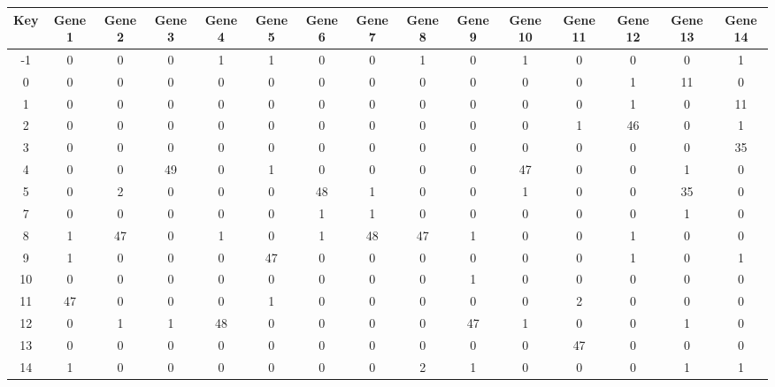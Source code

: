 \begin{tabular}{|c|c|c|c|c|c|c|c|c|c|c|c|c|c|c|}
\hline
Key & Gene 1 & Gene 2 & Gene 3 & Gene 4 & Gene 5 & Gene 6 & Gene 7 & Gene 8 & Gene 9 & Gene 10 & Gene 11 & Gene 12 & Gene 13 & Gene 14 \\
\hline
-1 & 0 & 0 & 0 & 1 & 1 & 0 & 0 & 1 & 0 & 1 & 0 & 0 & 0 & 1 \\
0 & 0 & 0 & 0 & 0 & 0 & 0 & 0 & 0 & 0 & 0 & 0 & 1 & 11 & 0 \\
1 & 0 & 0 & 0 & 0 & 0 & 0 & 0 & 0 & 0 & 0 & 0 & 1 & 0 & 11 \\
2 & 0 & 0 & 0 & 0 & 0 & 0 & 0 & 0 & 0 & 0 & 1 & 46 & 0 & 1 \\
3 & 0 & 0 & 0 & 0 & 0 & 0 & 0 & 0 & 0 & 0 & 0 & 0 & 0 & 35 \\
4 & 0 & 0 & 49 & 0 & 1 & 0 & 0 & 0 & 0 & 47 & 0 & 0 & 1 & 0 \\
5 & 0 & 2 & 0 & 0 & 0 & 48 & 1 & 0 & 0 & 1 & 0 & 0 & 35 & 0 \\
7 & 0 & 0 & 0 & 0 & 0 & 1 & 1 & 0 & 0 & 0 & 0 & 0 & 1 & 0 \\
8 & 1 & 47 & 0 & 1 & 0 & 1 & 48 & 47 & 1 & 0 & 0 & 1 & 0 & 0 \\
9 & 1 & 0 & 0 & 0 & 47 & 0 & 0 & 0 & 0 & 0 & 0 & 1 & 0 & 1 \\
10 & 0 & 0 & 0 & 0 & 0 & 0 & 0 & 0 & 1 & 0 & 0 & 0 & 0 & 0 \\
11 & 47 & 0 & 0 & 0 & 1 & 0 & 0 & 0 & 0 & 0 & 2 & 0 & 0 & 0 \\
12 & 0 & 1 & 1 & 48 & 0 & 0 & 0 & 0 & 47 & 1 & 0 & 0 & 1 & 0 \\
13 & 0 & 0 & 0 & 0 & 0 & 0 & 0 & 0 & 0 & 0 & 47 & 0 & 0 & 0 \\
14 & 1 & 0 & 0 & 0 & 0 & 0 & 0 & 2 & 1 & 0 & 0 & 0 & 1 & 1 \\
\hline
\end{tabular}